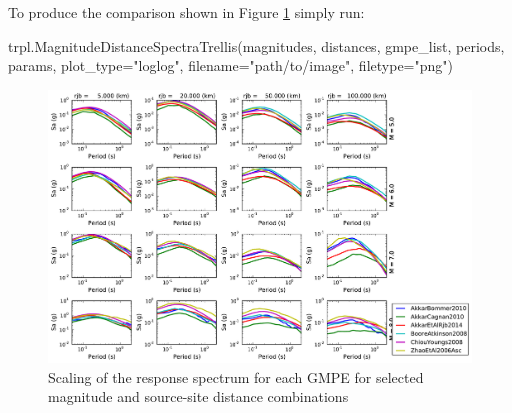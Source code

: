 To produce the comparison shown in Figure \ref{fig:spectra_simple_trellis} simply run:
\begin{python}
trpl.MagnitudeDistanceSpectraTrellis(magnitudes,
                                     distances,
                                     gmpe_list,
                                     periods,
                                     params, 
                                     plot_type="loglog",
                                     filename="path/to/image",
                                     filetype="png")
\end{python}
\begin{figure}[htbp]
	\centering
		\includegraphics[width=\textwidth]{./figures/trellis/spectra_trellis_simple.pdf}
	\caption{Scaling of the response spectrum for each GMPE for selected magnitude and source-site distance combinations}
	\label{fig:spectra_simple_trellis}
\end{figure}

